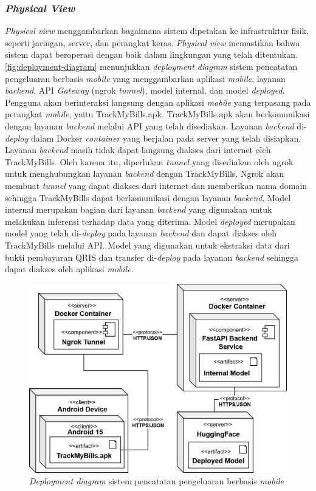 \subsubsection{\emph{Physical View}}
\label{subsubsec:physical-view}
\emph{Physical view} menggambarkan bagaimana sistem dipetakan ke infrastruktur fisik, seperti jaringan, server, dan perangkat keras. \emph{Physical view} memastikan bahwa sistem dapat beroperasi dengan baik dalam lingkungan yang telah ditentukan. \autoref{fig:deployment-diagram} menunjukkan \emph{deployment diagram} sistem pencatatan pengeluaran berbasis \emph{mobile} yang menggambarkan aplikasi \emph{mobile}, layanan \emph{backend}, API \emph{Gateway} (ngrok \emph{tunnel}), model internal, dan model \emph{deployed}. Pengguna akan berinteraksi langsung dengan aplikasi \emph{mobile} yang terpasang pada perangkat \emph{mobile}, yaitu TrackMyBills.apk. TrackMyBills.apk akan berkomunikasi dengan layanan \emph{backend} melalui API yang telah disediakan. Layanan \emph{backend} di-\emph{deploy} dalam Docker \emph{container} yang berjalan pada server yang telah disiapkan. Layanan \emph{backend} masih tidak dapat langsung diakses dari internet oleh TrackMyBills. Oleh karena itu, diperlukan \emph{tunnel} yang disediakan oleh ngrok untuk menghubungkan layanan \emph{backend} dengan TrackMyBills. Ngrok akan membuat \emph{tunnel} yang dapat diakses dari internet dan memberikan nama domain sehingga TrackMyBills dapat berkomunikasi dengan layanan \emph{backend}. Model internal merupakan bagian dari layanan \emph{backend} yang digunakan untuk melakukan inferensi terhadap data yang diterima. Model \emph{deployed} merupakan model yang telah di-\emph{deploy} pada layanan \emph{backend} dan dapat diakses oleh TrackMyBills melalui API. Model \donut{} yang digunakan untuk ekstraksi data dari bukti pembayaran QRIS dan transfer di-\emph{deploy} pada layanan \emph{backend} sehingga dapat diakses oleh aplikasi \emph{mobile}.
\begin{figure}[htbp]
    \centering
    \includegraphics[width=1\textwidth]{images/deployment-diagram.png}
    \caption{\emph{Deployment diagram} sistem pencatatan pengeluaran berbasis \emph{mobile}}
    \label{fig:deployment-diagram}
\end{figure}